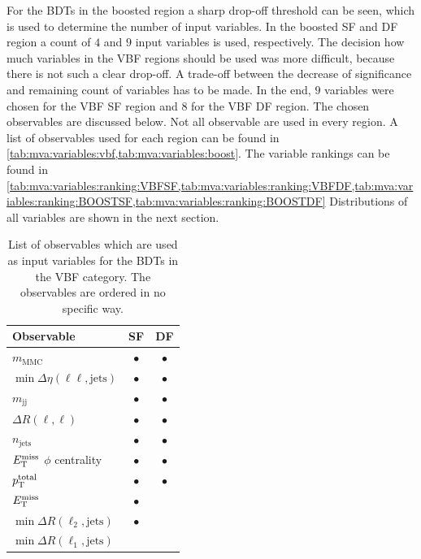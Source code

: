 For the BDTs in the boosted region a sharp drop-off threshold can be seen, which is used to determine the number
of input variables.
In the boosted SF and DF region a count of $4$ and $9$ input variables is used, respectively.
The decision how much variables in the VBF regions should be used was more difficult, because there is not such a clear drop-off.
A trade-off between the decrease of significance and remaining count of variables has to be made.
In the end, $9$ variables were chosen for the VBF SF region and $8$ for the VBF DF region.
The chosen observables are discussed below.
Not all observable are used in every region.
A list of observables used for each region can be found in \cref{tab:mva:variables:vbf,tab:mva:variables:boost}.
The variable rankings can be found in \cref{tab:mva:variables:ranking:VBFSF,tab:mva:variables:ranking:VBFDF,tab:mva:variables:ranking:BOOSTSF,tab:mva:variables:ranking:BOOSTDF}
Distributions of all variables are shown in the next section.

\begin{table}[htpb]
    \centering
    \caption{List of observables which are used as input variables for the BDTs in the VBF category.
             The observables are ordered in no specific way.}\label{tab:mva:variables:vbf}
    \begin{tabular}{lcc}
        \toprule
        Observable                                  & SF        & DF        \\ \midrule
        $m_\text{MMC}$                              & $\bullet$ & $\bullet$ \\
        $\min \Delta \eta (\ell\ell, \text{jets})$  & $\bullet$ & $\bullet$ \\
        $m_\text{jj}$                               & $\bullet$ & $\bullet$ \\
        $\Delta R(\ell,\ell)$                       & $\bullet$ & $\bullet$ \\
        $n_\text{jets}$                             & $\bullet$ & $\bullet$ \\
        $E_\text{T}^\text{miss}$ $\phi$ centrality                 & $\bullet$ & $\bullet$ \\
        $p_\text{T}^\text{total}$                          & $\bullet$ & $\bullet$ \\
        $E_\text{T}^\text{miss}$                                   & $\bullet$ &           \\
        $\min \Delta R (\ell_2, \text{jets})$       & $\bullet$ &           \\
        $\min \Delta R (\ell_1, \text{jets})$       &           &           \\
        \bottomrule
    \end{tabular}
\end{table}

